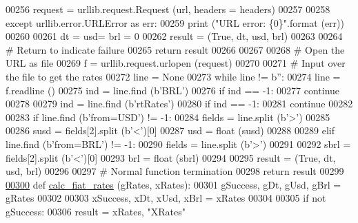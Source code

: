 \begin{DoxyCode}
{{{00256         request = urllib.request.Request (url, headers = headers)
00257         
00258     \textcolor{keywordflow}{except} urllib.error.URLError \textcolor{keyword}{as} err:
00259         \textcolor{keywordflow}{print} (\textcolor{stringliteral}{"URL error: \{0\}"}.format (err))
00260         
00261         dt = usd= brl = 0
00262         result = (\textcolor{keyword}{True}, dt, usd, brl)
00263         
00264         \textcolor{comment}{# Return to indicate failure}
00265         \textcolor{keywordflow}{return} result
00266 
00267         
00268     \textcolor{comment}{# Open the URL as file}
00269     f = urllib.request.urlopen (request)
00270     
00271     \textcolor{comment}{# Input over the file to get the rates}
00272     line = \textcolor{keywordtype}{None}
00273     \textcolor{keywordflow}{while} line != b\textcolor{stringliteral}{''}:
00274         line = f.readline ()
00275         ind = line.find (b\textcolor{stringliteral}{'BRL'})
00276         \textcolor{keywordflow}{if} ind == -1:
00277             \textcolor{keywordflow}{continue} 
00278         
00279         ind = line.find (b\textcolor{stringliteral}{'rtRates'})
00280         \textcolor{keywordflow}{if} ind == -1:
00281             \textcolor{keywordflow}{continue} 
00282                 
00283         \textcolor{keywordflow}{if} line.find (b\textcolor{stringliteral}{'from=USD'}) != -1:
00284             fields = line.split (b\textcolor{stringliteral}{'>'})
00285             
00286             susd = fields[2].split (b\textcolor{stringliteral}{'<'})[0]
00287             usd = float (susd)
00288         
00289         \textcolor{keywordflow}{elif} line.find (b\textcolor{stringliteral}{'from=BRL'}) != -1:
00290             fields = line.split (b\textcolor{stringliteral}{'>'})
00291             
00292             sbrl = fields[2].split (b\textcolor{stringliteral}{'<'})[0]
00293             brl = float (sbrl)
00294             
00295     result = (\textcolor{keyword}{True}, dt, usd, brl)
00296     
00297     \textcolor{comment}{# Normal function termination}
00298     \textcolor{keywordflow}{return} result
00299     
\hypertarget{exch2exch_8py_source.tex_l00300}{}\hyperlink{namespaceexch2exch_a2f3337121882596d0644f2d48ffb870c}{00300} \textcolor{keyword}{def }\hyperlink{namespaceexch2exch_a2f3337121882596d0644f2d48ffb870c}{calc\_fiat\_rates} (gRates, xRates):
00301     gSuccess, gDt, gUsd, gBrl = gRates 
00302     
00303     xSuccess, xDt, xUsd, xBrl = xRates
00304     
00305     \textcolor{keywordflow}{if} \textcolor{keywordflow}{not} gSuccess:
00306         result = xRates, \textcolor{stringliteral}{"XRates"}
}}}
\end{DoxyCode}
